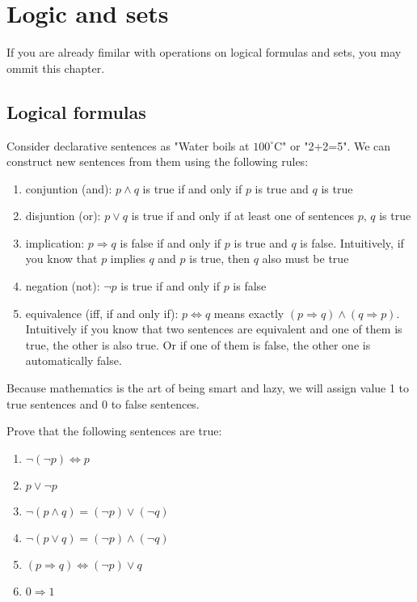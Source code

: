 %
%
%

\chapter{Logic and sets}
\label{logic_and_sets} %

If you are already fimilar with operations on logical formulas and sets, you may ommit this chapter.

\section{Logical formulas}
\label{sec:logic}
	Consider declarative sentences as "Water boils at $100^\circ$C" or "2+2=5". We can construct new sentences from them using the following rules:
	\begin{enumerate}
		\item conjuntion (and): $p \wedge q$ is true if and only if $p$ is true and $q$ is true
		\item disjuntion (or): $p \vee q$ is true if and only if at least one of sentences $p,\, q$ is true
		\item implication: $p \Rightarrow q$ is false if and only if $p$ is true and $q$ is false. Intuitively,
			if you know that $p$ implies $q$ and $p$ is true, then $q$ also must be true
		\item negation (not): $\neg p$ is true if and only if $p$ is false 
		\item equivalence (iff, if and only if): $p\Leftrightarrow q$ means exactly 
			$(p\Rightarrow q)\wedge(q\Rightarrow p)$. Intuitively if you know that two sentences are equivalent 
			and one of them is true, the other is also true. Or if one of them is false, the other one is automatically false.
	\end{enumerate}
	
\noindent Because mathematics is the art of being smart and lazy, we will assign value 1 to true sentences and 0 to
false sentences.

\begin{prob}
Prove that the following sentences are true:
	\begin{enumerate}
		\item $\neg(\neg p) \Leftrightarrow p$
		\item $p\vee \neg p$
		\item $\neg (p\wedge q) = (\neg p)\vee (\neg q)$
		\item $\neg (p\vee q) = (\neg p)\wedge (\neg q)$
		\item $(p\Rightarrow q)\Leftrightarrow (\neg p) \vee q$
		\item $0\Rightarrow 1$
	\end{enumerate}
\end{prob}

